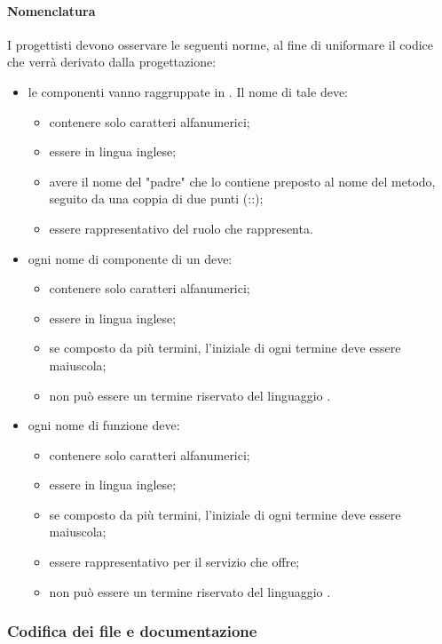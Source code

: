 \paragraph{Nomenclatura}
I progettisti devono osservare le seguenti norme, al fine di uniformare il codice che verrà derivato dalla progettazione:
\begin{itemize}
\item le componenti vanno raggruppate in . Il nome di tale  deve:
\begin{itemize}
\item contenere solo caratteri alfanumerici;
\item essere in lingua inglese;
\item avere il nome del  "padre" che lo contiene preposto al nome del metodo, seguito da una coppia di due punti (::);
\item essere rappresentativo del ruolo che rappresenta.
\end{itemize}
\item ogni nome di componente di un  deve:
\begin{itemize}
\item contenere solo caratteri alfanumerici;
\item essere in lingua inglese;
\item se composto da più termini, l'iniziale di ogni termine deve essere maiuscola;
\item non può essere un termine riservato del linguaggio .
\end{itemize}
\item ogni nome di funzione deve:
\begin{itemize}
\item contenere solo caratteri alfanumerici;
\item essere in lingua inglese;
\item se composto da più termini, l'iniziale di ogni termine deve essere maiuscola;
\item essere rappresentativo per il servizio che offre;
\item non può essere un termine riservato del linguaggio .
\end{itemize}
\end{itemize}

\subsubsection{Codifica dei file e documentazione}
